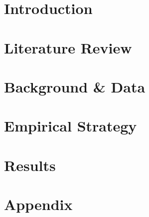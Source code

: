 \documentclass[12pt]{article}
\begin{document}
\doublespacing


\section{Introduction} \label{sec:introduction}



\section{Literature Review} \label{sec:literature}



\section{Background \& Data} \label{sec:data}



\section{Empirical Strategy} \label{sec:empirical}



\section{Results} \label{sec:result}





\singlespacing
\setlength\bibsep{0pt}

% 



\clearpage

\appendix
\section*{Appendix} \label{sec:appendix}

\end{document}
